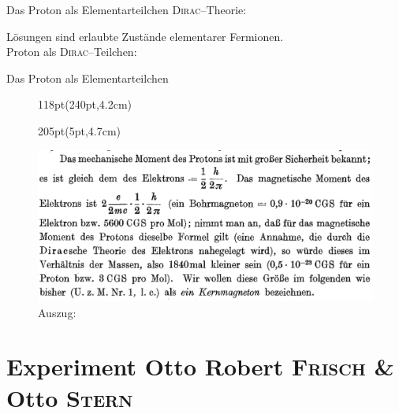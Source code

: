 \documentclass[t,9pt]{beamer}
\newcommand{\highlight}[3]{ \begin{textblock*}{#1}(#2,#3) \begin{tcolorbox} [enhanced,opacityfill=.1,colback=blue] \end{tcolorbox} \end{textblock*} } %
\begin{document}
        \begin{frame}{Das Proton als Elementarteilchen}
                \textsc{Dirac}--Theorie: 
                \begin{center}
                \end{center}
                Lösungen sind erlaubte Zustände elementarer Fermionen.
                \pause
                \\\vspace{.5cm} Proton als \textsc{Dirac}--Teilchen:
                \begin{center}
                \end{center}
                \tiny\vspace{-.2cm}\hspace{7.4cm}\cite{CODATA_nuclear_magneton}\normalsize
        \end{frame}

        \begin{frame}{Das Proton als Elementarteilchen}
                \begin{figure}
                        \highlight{118pt}{240pt}{4.2cm}
                        \highlight{205pt}{5pt}{4.7cm}
                        \includegraphics[width=\textwidth]{prosi_proton_als_dirac_teilchen.png}
                        \caption{Auszug:\cite{FrischStern1933}}
                \end{figure}
        \end{frame}

        \section{Experiment Otto Robert \textsc{Frisch} \& Otto \textsc{Stern}} 
\end{document}
